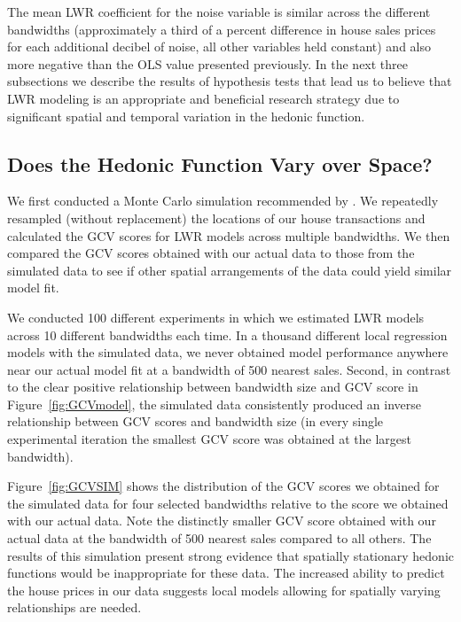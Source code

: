 \documentclass[leqno]{article}\usepackage[]{graphicx}\usepackage[]{color}
\begin{document}
The mean LWR coefficient for the noise variable is similar across the different bandwidths (approximately a third of a percent difference in house sales prices for each additional decibel of noise, all other variables held constant) and also more negative than the OLS value presented previously. In the next three subsections we describe the results of hypothesis tests that lead us to believe that LWR modeling is an appropriate and beneficial research strategy due to significant spatial and temporal variation in the hedonic function. 

\subsection*{Does the Hedonic Function Vary over Space?}

We first conducted a Monte Carlo simulation recommended by \citet{Fotheringham2002}. We repeatedly resampled (without replacement) the locations of our house transactions and calculated the GCV scores for LWR models across multiple bandwidths. We then compared the GCV scores obtained with our actual data to those from the simulated data to see if other spatial arrangements of the data could yield similar model fit.  

We conducted 100 different experiments in which we estimated LWR models across 10 different bandwidths each time. In a thousand different local regression models with the simulated data, we never obtained model performance anywhere near our actual model fit at a bandwidth of 500 nearest sales. Second, in contrast to the clear positive relationship between bandwidth size and GCV score in Figure~\ref{fig:GCVmodel}, the simulated data consistently produced an inverse relationship between GCV scores and bandwidth size (in every single experimental iteration the smallest GCV score was obtained at the largest bandwidth).

Figure~\ref{fig:GCVSIM} shows the distribution of the GCV scores we obtained for the simulated data for four selected bandwidths relative to the score we obtained with our actual data. Note the distinctly smaller GCV score obtained with our actual data at the bandwidth of 500 nearest sales compared to all others. The results of this simulation present strong evidence that spatially stationary hedonic functions would be inappropriate for these data. The increased ability to predict the house prices in our data suggests local models allowing for spatially varying relationships are needed. 
\end{document}
